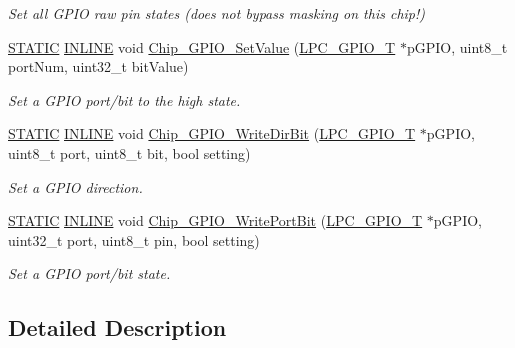 \begin{DoxyCompactItemize}
\begin{DoxyCompactList}\small\item\em Set all G\+P\+IO raw pin states (does not bypass masking on this chip!) \end{DoxyCompactList}\item 
\hyperlink{group__LPC__Types__Public__Macros_ga10b2d890d871e1489bb02b7e70d9bdfb}{S\+T\+A\+T\+IC} \hyperlink{group__LPC__Types__Public__Types_ga2eb6f9e0395b47b8d5e3eeae4fe0c116}{I\+N\+L\+I\+NE} void \hyperlink{group__GPIO__17XX__40XX_ga88bed30fb124192d45c7bed021636643}{Chip\+\_\+\+G\+P\+I\+O\+\_\+\+Set\+Value} (\hyperlink{structLPC__GPIO__T}{L\+P\+C\+\_\+\+G\+P\+I\+O\+\_\+T} $\ast$p\+G\+P\+IO, uint8\+\_\+t port\+Num, uint32\+\_\+t bit\+Value)
\begin{DoxyCompactList}\small\item\em Set a G\+P\+IO port/bit to the high state. \end{DoxyCompactList}\item 
\hyperlink{group__LPC__Types__Public__Macros_ga10b2d890d871e1489bb02b7e70d9bdfb}{S\+T\+A\+T\+IC} \hyperlink{group__LPC__Types__Public__Types_ga2eb6f9e0395b47b8d5e3eeae4fe0c116}{I\+N\+L\+I\+NE} void \hyperlink{group__GPIO__17XX__40XX_ga4b726d64407e21f40d4fc23f16da04ab}{Chip\+\_\+\+G\+P\+I\+O\+\_\+\+Write\+Dir\+Bit} (\hyperlink{structLPC__GPIO__T}{L\+P\+C\+\_\+\+G\+P\+I\+O\+\_\+T} $\ast$p\+G\+P\+IO, uint8\+\_\+t port, uint8\+\_\+t bit, bool setting)
\begin{DoxyCompactList}\small\item\em Set a G\+P\+IO direction. \end{DoxyCompactList}\item 
\hyperlink{group__LPC__Types__Public__Macros_ga10b2d890d871e1489bb02b7e70d9bdfb}{S\+T\+A\+T\+IC} \hyperlink{group__LPC__Types__Public__Types_ga2eb6f9e0395b47b8d5e3eeae4fe0c116}{I\+N\+L\+I\+NE} void \hyperlink{group__GPIO__17XX__40XX_ga4ce4cce2499df5cee49a591ee5be6a48}{Chip\+\_\+\+G\+P\+I\+O\+\_\+\+Write\+Port\+Bit} (\hyperlink{structLPC__GPIO__T}{L\+P\+C\+\_\+\+G\+P\+I\+O\+\_\+T} $\ast$p\+G\+P\+IO, uint32\+\_\+t port, uint8\+\_\+t pin, bool setting)
\begin{DoxyCompactList}\small\item\em Set a G\+P\+IO port/bit state. \end{DoxyCompactList}\end{DoxyCompactItemize}


\subsection{Detailed Description}


